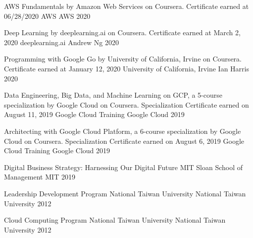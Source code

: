 

\begin{cvhonors}

  \cvhonor
    {AWS Fundamentals by Amazon Web Services on Coursera. Certificate earned at 06/28/2020} %
    {AWS} %
    {AWS} %
    {2020} %

  \cvhonor
    {Deep Learning by deeplearning.ai on Coursera. Certificate earned at March 2, 2020} %
    {deeplearning.ai} %
    {Andrew Ng} %
    {2020} %

  \cvhonor
    {Programming with Google Go by University of California, Irvine on Coursera. Certificate earned at January 12, 2020} %
    {University of California, Irvine} %
    {Ian Harris} %
    {2020} %

  \cvhonor
    {Data Engineering, Big Data, and Machine Learning on GCP, a 5-course specialization by Google Cloud on Coursera. Specialization Certificate earned on August 11, 2019} %
    {Google Cloud Training} %
    {Google Cloud} %
    {2019} %

  \cvhonor
    {Architecting with Google Cloud Platform, a 6-course specialization by Google Cloud on Coursera. Specialization Certificate earned on August 6, 2019} %
    {Google Cloud Training} %
    {Google Cloud} %
    {2019} %

  \cvhonor
    {Digital Business Strategy: Harnessing Our Digital Future} %
    {MIT Sloan School of Management} %
    {MIT} %
    {2019} %

  \cvhonor
    {Leadership Development Program} %
    {National Taiwan University} %
    {National Taiwan University} %
    {2012} %

  \cvhonor
    {Cloud Computing Program} %
    {National Taiwan University} %
    {National Taiwan University} %
    {2012} %

\end{cvhonors}
